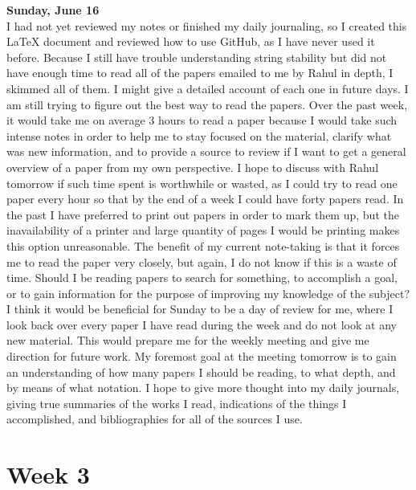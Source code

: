 \documentclass[12pt, letterpaper]{article}
\begin{document}
{\bf Sunday, June 16}\\
I had not yet reviewed my notes or finished my daily journaling, so I created this LaTeX document and reviewed how to use GitHub, as I have never used it before. Because I still have trouble understanding string stability but did not have enough time to read all of the papers emailed to me by Rahul in depth, I skimmed all of them. I might give a detailed account of each one in future days. I am still trying to figure out the best way to read the papers. Over the past week, it would take me on average 3 hours to read a paper because I would take such intense notes in order to help me to stay focused on the material, clarify what was new information, and to provide a source to review if I want to get a general overview of a paper from my own perspective. I hope to discuss with Rahul tomorrow if such time spent is worthwhile or wasted, as I could try to read one paper every hour so that by the end of a week I could have forty papers read. In the past I have preferred to print out papers in order to mark them up, but the inavailability of a printer and large quantity of pages I would be printing makes this option unreasonable. The benefit of my current note-taking is that it forces me to read the paper very closely, but again, I do not know if this is a waste of time. Should I be reading papers to search for something, to accomplish a goal, or to gain information for the purpose of improving my knowledge of the subject? I think it would be beneficial for Sunday to be a day of review for me, where I look back over every paper I have read during the week and do not look at any new material. This would prepare me for the weekly meeting and give me direction for future work. My foremost goal at the meeting tomorrow is to gain an understanding of how many papers I should be reading, to what depth, and by means of what notation. I hope to give more thought into my daily journals, giving true summaries of the works I read, indications of the things I accomplished, and bibliographies for all of the sources I use.

\pagebreak


\noindent \section*{Week 3}
\end{document}
